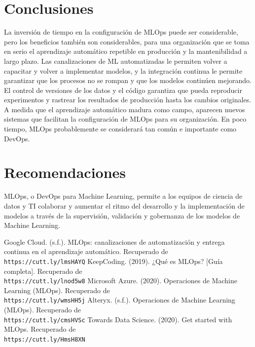 \documentclass[twoside,twocolumn]{article}
\begin{document}
\section{Conclusiones}
\noindent La inversión de tiempo en la configuración de MLOps puede ser considerable, pero los beneficios también son considerables, para una organización que se toma en serio el aprendizaje automático repetible en producción y la mantenibilidad a largo plazo. Las canalizaciones de ML automatizadas le permiten volver a capacitar y volver a implementar modelos, y la integración continua le permite garantizar que los procesos no se rompan y que los modelos continúen mejorando. El control de versiones de los datos y el código garantiza que pueda reproducir experimentos y rastrear los resultados de producción hasta los cambios originales.\\[0.1in]
A medida que el aprendizaje automático madura como campo, aparecen nuevos sistemas que facilitan la configuración de MLOps para su organización. En poco tiempo, MLOps probablemente se considerará tan común e importante como DevOps.


\section{Recomendaciones}
\noindent MLOps, o DevOps para Machine Learning, permite a los equipos de ciencia de datos y TI colaborar y aumentar el ritmo del desarrollo y la implementación de modelos a través de la supervisión, validación y gobernanza de los modelos de Machine Learning.


\begin{thebibliography}{99} 
    \bibitem{}
    Google Cloud. (s.f.). MLOps: canalizaciones de automatización y entrega continua en el aprendizaje automático. Recuperado de 
    \\\texttt{https://cutt.ly/lmsHAYQ}
    \bibitem{}
    KeepCoding. (2019). ¿Qué es MLOps? [Guía completa]. Recuperado de 
    \\\texttt{https://cutt.ly/lnod5w8}
    \bibitem{}
    Microsoft Azure. (2020). Operaciones de Machine Learning (MLOps). Recuperado de 
    \\\texttt{https://cutt.ly/wmsHH5j}
    \bibitem{}
    Alteryx. (s.f.). Operaciones de Machine Learning (MLOps). Recuperado de 
    \\\texttt{https://cutt.ly/cmsHVSc}
    \bibitem{}
    Towards Data Science. (2020). Get started with MLOps. Recuperado de 
    \\\texttt{https://cutt.ly/HmsH8XN}
\end{thebibliography}
\end{document}
